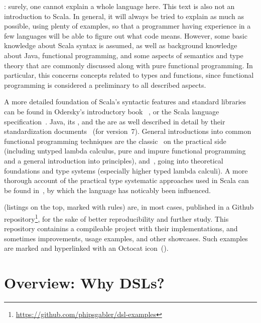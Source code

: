 : surely, one cannot explain a whole language
here. This text is also not an introduction to Scala. In general, it will always be tried to
explain as much as possible, using plenty of examples, so that a programmer having experience in a
few languages will be able to figure out what code means. However, some basic knowledge about Scala
syntax is assumed, as well as background knowledge about Java, functional programming, and some
aspects of semantics and type theory that are commonly discussed along with pure functional
programming. In particular, this concerns concepts related to types and functions, since functional
programming is considered a preliminary to all described aspects.

A more detailed foundation of Scala's syntactic features and standard libraries can be found in
Odersky's introductory book ~\cite{odersky2008:programming}, or
the Scala language specification~\cite{odersky2014:scala_spec}. Java, its , and the
 are as well described in detail by their standardization
documents~\cite{gosling2013:java_spec, lindholm2013:jvm_spec, oracle:java_api_spec} (for
version~7). General introductions into common functional programming techniques are the
classic~\cite{abelson1996:structure} on the practical side (including untyped lambda calculus, pure
and impure functional programming and a general introduction into \dsl{} principles),
and~\cite{thompson1991:type}, going into theoretical foundations and type systems (especially higher
typed lambda calculi). A more thorough account of the practical type systematic approaches used in
Scala can be found in~\cite{pierce2002:types}, by which the language has noticably been influenced.

 (listings on the top, marked with rules) are, in most
cases, published in a Github
repository\footnote{\protect\url{https://github.com/phipsgabler/dsl-examples}}, for the sake of
better reproducibility and further study. This repository containins a compileable 
project with their implementations, and sometimes improvements, usage examples, and other
showcases. Such examples are marked and hyperlinked with an Octocat
icon~().


\section{Overview: Why DSLs?}
\label{sec:overview}

